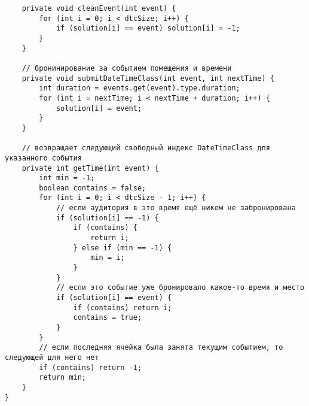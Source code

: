 \begin{lstlisting}
	private void cleanEvent(int event) {
		for (int i = 0; i < dtcSize; i++) {
			if (solution[i] == event) solution[i] = -1;
		}
	}
	
	// бронинирование за событием помещения и времени
	private void submitDateTimeClass(int event, int nextTime) {
		int duration = events.get(event).type.duration;
		for (int i = nextTime; i < nextTime + duration; i++) {
			solution[i] = event;
		}
	}
	
	// возвращает следующий свободный индекс DateTimeClass для указанного события
	private int getTime(int event) {
		int min = -1;
		boolean contains = false;
		for (int i = 0; i < dtcSize - 1; i++) {
			// если аудитория в это время ещё никем не забронирована
			if (solution[i] == -1) {
				if (contains) {
					return i;
				} else if (min == -1) {
					min = i;
				}
			}
			// если это событие уже бронировало какое-то время и место
			if (solution[i] == event) {
				if (contains) return i;
				contains = true;
			}
		}
		// если последняя ячейка была занята текущим событием, то следующей для него нет
		if (contains) return -1;
		return min;
	}
}

\end{lstlisting}